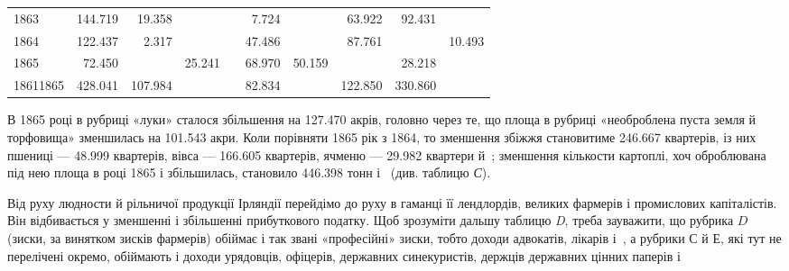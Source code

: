 \begin{table}[H]
\begin{tabularx}{\textwidth}{X*{9}{r}}
    1863 & \num{144.719} & \phantom{0}\num{19.358} & \textemdash{} & \textemdash{} &  \phantom{0}\num{7.724} & \textemdash{} & \phantom{0}\num{63.922} & \phantom{0}\num{92.431} & \textemdash{} \\
    
    1864 & \num{122.437} & \phantom{00}\num{2.317} & \textemdash{} & \textemdash{} & \num{47.486} & \textemdash{} & \phantom{0}\num{87.761} & \textemdash{} & \num{10.493} \\
    
    1865 & \phantom{0}\num{72.450} & \textemdash{} & \num{25.241} & \textemdash{} & \num{68.970} & \num{50.159} & \textemdash{} & \phantom{0}\num{28.218} & \textemdash{} \\
    
    1861\textendash{}1865 & \num{428.041} & \num{107.984} & \textemdash{} & \textemdash{} & \num{82.834} & \textemdash{} & \num{122.850} & \num{330.860} & \textemdash{} \\
  \end{tabularx}
\end{table}

\setlength{\tabcolsep}{\tabcolsepdef}

\noindent{}В 1865 році в рубриці «луки» сталося збільшення на \num{127.470} акрів,
головно через те, що площа в рубриці «необроблена пуста
земля й торфовища» зменшилась на \num{101.543} акри. Коли порівняти
1865 рік з 1864, то зменшення збіжжя становитиме \num{246.667}
квартерів, із них пшениці — \num{48.999} квартерів, вівса — \num{166.605} квартерів,
ячменю — \num{29.982} квартери й~; зменшення кількости
картоплі, хоч оброблювана під нею площа в році 1865 і збільшилась,
становило \num{446.398} тонн і~ (див. таблицю \emph{С}).

Від руху людности й рільничої продукції Ірляндії перейдімо
до руху в гаманці її лендлордів, великих фармерів і промислових
капіталістів. Він відбивається у зменшенні і збільшенні прибуткового
податку. Щоб зрозуміти дальшу таблицю \emph{D}, треба зауважити,
що рубрика $D$ (зиски, за винятком зисків фармерів) обіймає
і так звані «професійні» зиски, тобто доходи адвокатів,
лікарів і~, а рубрики $С$ й $Е$, які тут не перелічені окремо,
обіймають і доходи урядовців, офіцерів, державних синекуристів,
держців державних цінних паперів і~
